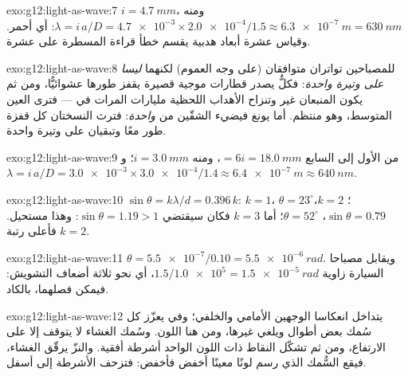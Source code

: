 \begin{solution}{exo:g12:light-as-wave:7}
$i = \qty{4.7}{mm}$، ومنه $\lambda = i\,a/D = \num{4.7e-3} \times
\num{2.0e-4}/1.5 \approx \qty{6.3e-7}{m} = \qty{630}{nm}$: أي أحمر.
وقياس عشرة أبعاد هدبية يقسم خطأ قراءة المسطرة على عشرة.
\end{solution}

\begin{solution}{exo:g12:light-as-wave:8}
للمصباحين تواتران متوافقان (على وجه العموم) لكنهما \emph{ليسا على
وتيرة واحدة}: فكلٌّ يصدر قطارات موجية قصيرة يقفز طورها عشوائيًّا، ومن ثم
يكون المنبعان غير  وتنزاح الأهداب اللحظية
مليارات المرات في  --- فترى العين المتوسط، وهو منتظم.
أما يونغ فيضيء الشقّين من  \emph{واحدة}: فترث النسختان
كل قفزة طور معًا وتبقيان على وتيرة واحدة.
\end{solution}

\begin{solution}{exo:g12:light-as-wave:9}
من الأول إلى السابع $= 6i = \qty{18.0}{mm}$، ومنه $i = \qty{3.0}{mm}$؛
و$\lambda = i\,a/D = \num{3.0e-3} \times \num{3.0e-4}/1.4 \approx
\qty{6.4e-7}{m} \approx \qty{640}{nm}$.
\end{solution}

\begin{solution}{exo:g12:light-as-wave:10}
$\sin\theta = k\lambda/d = 0.396\,k$: $k = 1$، $\theta = 23^\circ$؛
$k = 2$، $\sin\theta = 0.79$، $\theta = 52^\circ$؛ أما $k = 3$ فكان سيقتضي
$\sin\theta = 1.19 > 1$: وهذا مستحيل. فأعلى رتبة $k = 2$.
\end{solution}

\begin{solution}{exo:g12:light-as-wave:11}
$\theta = \num{5.5e-7}/0.10 = \qty{5.5e-6}{rad}$. ويقابل مصباحا السيارة
زاوية $1.5/\num{1.0e5} = \qty{1.5e-5}{rad}$، أي نحو ثلاثة أضعاف
التشويش: فيمكن فصلهما، بالكاد.
\end{solution}

\begin{solution}{exo:g12:light-as-wave:12}
يتداخل انعكاسا الوجهين الأمامي والخلفي؛ وفي  يعزّز كل
سُمك بعض أطوال  ويلغي غيرها، ومن هنا اللون.
وسُمك الغشاء لا يتوقف إلا على الارتفاع، ومن ثم تشكّل النقاط ذات اللون
الواحد أشرطة أفقية. والنزّ يرقّق الغشاء، فيقع السُّمك
الذي رسم لونًا معينًا أخفض فأخفض: فتزحف الأشرطة
إلى أسفل.
\end{solution}

